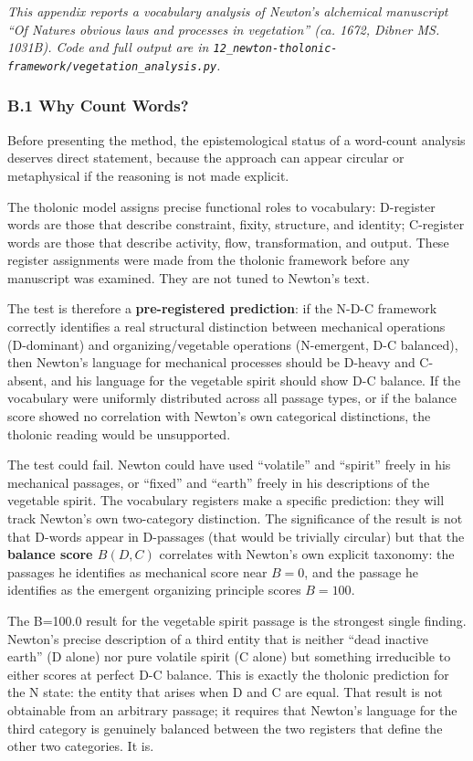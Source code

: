 \documentclass[
  11pt,
  letterpaper,
]{article}
\begin{document}
\emph{This appendix reports a vocabulary analysis of Newton's alchemical
manuscript ``Of Natures obvious laws and processes in vegetation'' (ca.
1672, Dibner MS. 1031B). Code and full output are in
\texttt{12\_newton-tholonic-framework/vegetation\_analysis.py}.}

\subsubsection{B.1 Why Count Words?}\label{b.1-why-count-words}

Before presenting the method, the epistemological status of a word-count
analysis deserves direct statement, because the approach can appear
circular or metaphysical if the reasoning is not made explicit.

The tholonic model assigns precise functional roles to vocabulary:
D-register words are those that describe constraint, fixity, structure,
and identity; C-register words are those that describe activity, flow,
transformation, and output. These register assignments were made from
the tholonic framework before any manuscript was examined. They are not
tuned to Newton's text.

The test is therefore a \textbf{pre-registered prediction}: if the N-D-C
framework correctly identifies a real structural distinction between
mechanical operations (D-dominant) and organizing/vegetable operations
(N-emergent, D-C balanced), then Newton's language for mechanical
processes should be D-heavy and C-absent, and his language for the
vegetable spirit should show D-C balance. If the vocabulary were
uniformly distributed across all passage types, or if the balance score
showed no correlation with Newton's own categorical distinctions, the
tholonic reading would be unsupported.

The test could fail. Newton could have used ``volatile'' and ``spirit''
freely in his mechanical passages, or ``fixed'' and ``earth'' freely in
his descriptions of the vegetable spirit. The vocabulary registers make
a specific prediction: they will track Newton's own two-category
distinction. The significance of the result is not that D-words appear
in D-passages (that would be trivially circular) but that the
\textbf{balance score \(B(D,C)\)} correlates with Newton's own explicit
taxonomy: the passages he identifies as mechanical score near \(B = 0\),
and the passage he identifies as the emergent organizing principle
scores \(B = 100\).

The B=100.0 result for the vegetable spirit passage is the strongest
single finding. Newton's precise description of a third entity that is
neither ``dead inactive earth'' (D alone) nor pure volatile spirit (C
alone) but something irreducible to either scores at perfect D-C
balance. This is exactly the tholonic prediction for the N state: the
entity that arises when D and C are equal. That result is not obtainable
from an arbitrary passage; it requires that Newton's language for the
third category is genuinely balanced between the two registers that
define the other two categories. It is.
\end{document}
